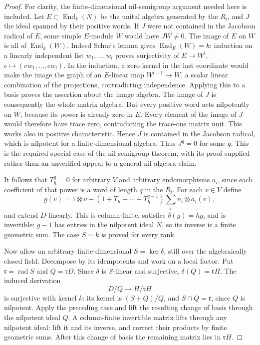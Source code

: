 \begin{proof}
For clarity, the finite-dimensional nil-semigroup argument needed here
is included.  Let $E\subset\operatorname{End}_k(N)$ be the unital algebra
generated by the $R_i$, and $J$ the ideal spanned by their positive words.
If $J$ were not contained in the Jacobson radical of $E$, some simple
$E$-module $W$ would have $JW\ne0$.  The image of $E$ on $W$ is all of
$\operatorname{End}_k(W)$.  Indeed Schur's lemma gives
$\operatorname{End}_E(W)=k$; induction on a linearly independent list
$w_1,\ldots,w_l$ proves surjectivity of
$E\to W^l$, $e\mapsto(ew_1,\ldots,ew_l)$.
In the induction, a zero kernel in the last coordinate would make the
image the graph of an $E$-linear map $W^{l-1}\to W$, a scalar linear
combination of the projections, contradicting independence.
Applying this to a basis proves the assertion about the image algebra.
The image of $J$ is consequently the whole matrix algebra.  But every
positive word acts nilpotently on $W$, because its power is already zero
in $E$.  Every element of the image of $J$ would therefore have trace zero,
contradicting the trace-one matrix unit.  This works also in positive
characteristic.  Hence $J$ is contained in the Jacobson radical, which is
nilpotent for a finite-dimensional algebra.  Thus $J^q=0$ for some $q$.
This is the required special case of the nil-semigroup theorem, with its
proof supplied rather than an unverified appeal to a general nil-algebra
claim.

It follows that $T_h^q=0$ for arbitrary $V$ and arbitrary endomorphisms
$a_i$, since each coefficient of that power is a word of length $q$ in
the $R_i$.  For each $v\in V$ define
\[
 g(v)=1\otimes v+
       (1+T_h+\cdots+T_h^{q-1})\sum_i n_i\otimes a_i(v),
\]
and extend $D$-linearly.  This is column-finite, satisfies
$\delta(g)=hg$, and is invertible: $g-1$ has entries in the nilpotent
ideal $N$, so its inverse is a finite geometric sum.  The case $S=k$
is proved for every rank.

Now allow an arbitrary finite-dimensional $S=\ker\delta$, still over
the algebraically closed field.  Decompose by its idempotents and work
on a local factor.  Put $\mathfrak r=\operatorname{rad}S$ and
$Q=\mathfrak rD$.  Since $\delta$ is $S$-linear and surjective,
$\delta(Q)=\mathfrak rH$.  The induced derivation
\[
       D/Q\longrightarrow H/\mathfrak rH
\]
is surjective with kernel $k$: its kernel is $(S+Q)/Q$, and
$S\cap Q=\mathfrak r$, since $Q$ is nilpotent.
Apply the preceding case and lift the resulting change of basis through
the nilpotent ideal $Q$.  A column-finite invertible matrix lifts through
any nilpotent ideal: lift it and its inverse, and correct their products
by finite geometric sums.  After this change of basis the remaining
matrix lies in $\mathfrak rH$.


\end{proof}
